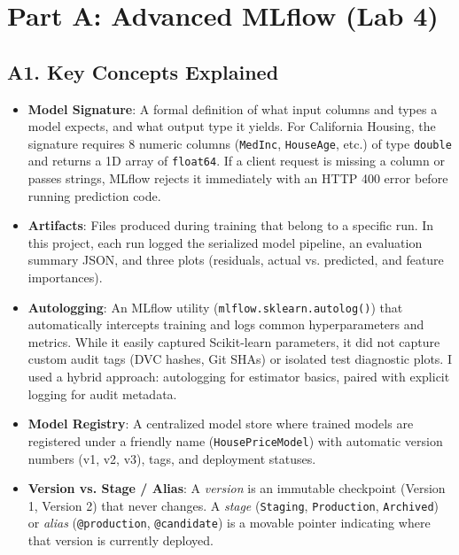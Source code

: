 \documentclass[11pt,a4paper]{article}
\begin{document}
\section{Part A: Advanced MLflow (Lab 4)}

\subsection{A1. Key Concepts Explained}
\begin{itemize}
    \item \textbf{Model Signature}: A formal definition of what input columns and types a model expects, and what output type it yields. For California Housing, the signature requires 8 numeric columns (\texttt{MedInc}, \texttt{HouseAge}, etc.) of type \texttt{double} and returns a 1D array of \texttt{float64}. If a client request is missing a column or passes strings, MLflow rejects it immediately with an HTTP 400 error before running prediction code.
    \item \textbf{Artifacts}: Files produced during training that belong to a specific run. In this project, each run logged the serialized model pipeline, an evaluation summary JSON, and three plots (residuals, actual vs. predicted, and feature importances).
    \item \textbf{Autologging}: An MLflow utility (\texttt{mlflow.sklearn.autolog()}) that automatically intercepts training and logs common hyperparameters and metrics. While it easily captured Scikit-learn parameters, it did not capture custom audit tags (DVC hashes, Git SHAs) or isolated test diagnostic plots. I used a hybrid approach: autologging for estimator basics, paired with explicit logging for audit metadata.
    \item \textbf{Model Registry}: A centralized model store where trained models are registered under a friendly name (\texttt{HousePriceModel}) with automatic version numbers (v1, v2, v3), tags, and deployment statuses.
    \item \textbf{Version vs. Stage / Alias}: A \textit{version} is an immutable checkpoint (Version 1, Version 2) that never changes. A \textit{stage} (\texttt{Staging}, \texttt{Production}, \texttt{Archived}) or \textit{alias} (\texttt{@production}, \texttt{@candidate}) is a movable pointer indicating where that version is currently deployed.
\end{itemize}
\end{document}
